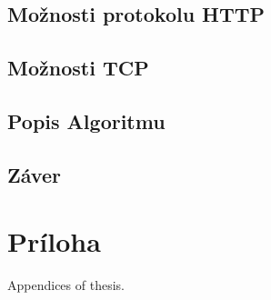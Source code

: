 \documentclass[
  printed, %
  table,   %
  lof,     %
  lot,     %
]{fithesis3}
\begin{document}
\section{Možnosti protokolu HTTP}
\section{Možnosti TCP}
\section{Popis Algoritmu}

\section{Záver}

\makeatletter\thesis@blocks@clear\makeatother
{} %
\printindex

\appendix %
\chapter{Príloha}
Appendices of thesis.
\end{document}

